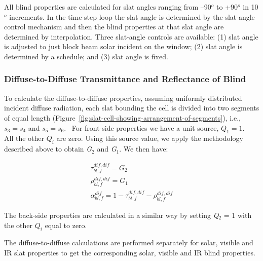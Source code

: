 All blind properties are calculated for slat angles ranging from --90\(^{o}\) to +90\(^{o}\) in 10\(^{o}\) increments. In the time-step loop the slat angle is determined by the slat-angle control mechanism and then the blind properties at that slat angle are determined by interpolation. Three slat-angle controls are available: (1) slat angle is adjusted to just block beam solar incident on the window; (2) slat angle is determined by a schedule; and (3) slat angle is fixed.

\subsubsection{Diffuse-to-Diffuse Transmittance and Reflectance of Blind}\label{diffuse-to-diffuse-transmittance-and-reflectance-of-blind}

To calculate the diffuse-to-diffuse properties, assuming uniformly distributed incident diffuse radiation, each slat bounding the cell is divided into two segments of equal length (Figure~\ref{fig:slat-cell-showing-arrangement-of-segments}), i.e., \({s_3} = {s_4}\) and \({s_5} = {s_6}\).~ For front-side properties we have a unit source, \({Q_1} = 1\).~ All the other \({Q_i}\) are zero. Using this source value, we apply the methodology described above to obtain \emph{G\(_{2}\)} and \emph{G\(_{1}\)}. We then have:

\begin{equation}
\begin{array}{l}\tau_{bl,f}^{dif,dif} = {G_2}\\\rho_{bl,f}^{dif,dif} = {G_1}\\\alpha_{bl,f}^{dif} = 1 - \tau_{bl,f}^{dif,dif} - \rho_{bl,f}^{dif,dif}\end{array}
\end{equation}

The back-side properties are calculated in a similar way by setting \emph{Q\(_{2}\)} = 1 with the other \({Q_i}\) equal to zero.

The diffuse-to-diffuse calculations are performed separately for solar, visible and IR slat properties to get the corresponding solar, visible and IR blind properties.

